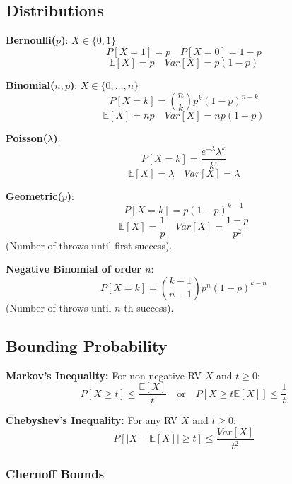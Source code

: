 \subsection{Distributions}

\begin{definition}
	\textbf{Bernoulli($p$)}: $X \in \{0,1\}$
	$$P[X=1] = p \quad P[X=0] = 1-p$$
	$$\mathbb{E}[X] = p \quad Var[X] = p(1-p)$$
\end{definition}

\begin{definition}
	\textbf{Binomial($n, p$)}: $X \in \{0,\dots,n\}$
	$$P[X=k] = \binom{n}{k} p^k (1-p)^{n-k}$$
	$$\mathbb{E}[X] = np \quad Var[X] = np(1-p)$$
\end{definition}

\begin{definition}
	\textbf{Poisson($\lambda$)}:
	$$P[X=k] = \frac{e^{-\lambda} \lambda^k}{k!}$$
	$$\mathbb{E}[X] = \lambda \quad Var[X] = \lambda$$
\end{definition}

\begin{definition}
	\textbf{Geometric($p$)}:
	$$P[X=k] = p(1-p)^{k-1}$$
	$$\mathbb{E}[X] = \frac{1}{p} \quad Var[X] = \frac{1-p}{p^2}$$
	(Number of throws until first success).
\end{definition}

\begin{definition}
	\textbf{Negative Binomial of order $n$}:
	$$P[X=k] = \binom{k-1}{n-1} p^n (1-p)^{k-n}$$
	(Number of throws until $n$-th success).
\end{definition}

\subsection{Bounding Probability}

\begin{theorem}
	\textbf{Markov's Inequality:} For non-negative RV $X$ and $t \ge 0$:
	$$P[X \geq t] \leq \frac{\mathbb{E}[X]}{t} \quad \text{or} \quad P[X \geq t \mathbb{E}[X]] \leq \frac{1}{t}$$
\end{theorem}

\begin{theorem}
	\textbf{Chebyshev's Inequality:} For any RV $X$ and $t \ge 0$:
	$$P[|X-\mathbb{E}[X]| \geq t] \leq \frac{Var[X]}{t^2}$$
\end{theorem}

\subsubsection{Chernoff Bounds}

